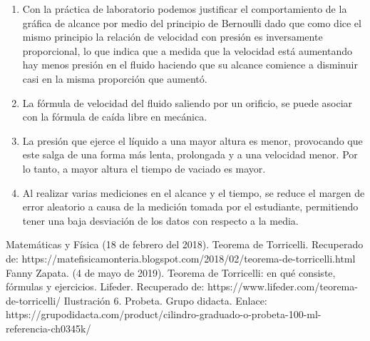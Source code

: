 \documentclass[journal,transmag]{IEEEtran}
\begin{document}
	\begin{enumerate}[label=(\roman*)]
	
    \item Con la práctica de laboratorio podemos justificar el comportamiento de la gráfica de alcance por medio del principio de Bernoulli dado que como dice el mismo principio la relación de velocidad con presión es inversamente proporcional, lo que indica que a medida que la velocidad está aumentando hay menos presión en el fluido haciendo que su alcance comience a disminuir casi en la misma proporción que aumentó. 
    \item La fórmula de velocidad del fluido saliendo por un orificio, se puede asociar con la fórmula de caída libre en mecánica. 
    \item La presión que ejerce el líquido a una mayor altura es menor, provocando que este salga de una forma más lenta, prolongada y a una velocidad menor. Por lo tanto, a mayor altura el tiempo de vaciado es mayor. 
    \item Al realizar varias mediciones en el alcance y el tiempo, se reduce el margen de error aleatorio a causa de la medición tomada por el estudiante, permitiendo tener una baja desviación de los datos con respecto a la media.   

	\end{enumerate}

\appendices


\ifCLASSOPTIONcaptionsoff
  \newpage
\fi


\begin{thebibliography}{1}


  Matemáticas y Física (18 de febrero del 2018). Teorema de Torricelli. Recuperado de: https://matefisicamonteria.blogspot.com/2018/02/teorema-de-torricelli.html 
 Fanny Zapata. (4 de mayo de 2019). Teorema de Torricelli: en qué consiste, fórmulas y ejercicios. Lifeder. Recuperado de: https://www.lifeder.com/teorema-de-torricelli/ 
 Ilustración 6. Probeta. Grupo didacta. Enlace: https://grupodidacta.com/product/cilindro-graduado-o-probeta-100-ml-referencia-ch0345k/  
\end{thebibliography}
\end{document}
